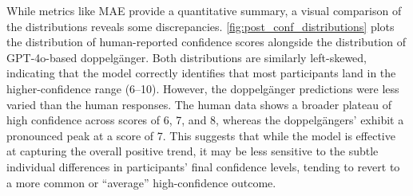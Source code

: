 While metrics like MAE provide a quantitative summary, a visual comparison of the distributions reveals some discrepancies. \cref{fig:post_conf_distributions} plots the distribution of human-reported confidence scores alongside the distribution of GPT-4o-based doppelgänger. Both distributions are similarly left-skewed, indicating that the model correctly identifies that most participants land in the higher-confidence range (6--10). However, the doppelgänger predictions were less varied than the human responses. The human data shows a broader plateau of high confidence across scores of 6, 7, and 8, whereas the doppelgängers' exhibit a pronounced peak at a score of 7. This suggests that while the model is effective at capturing the overall positive trend, it may be less sensitive to the subtle individual differences in participants' final confidence levels, tending to revert to a more common or ``average'' high-confidence outcome.




